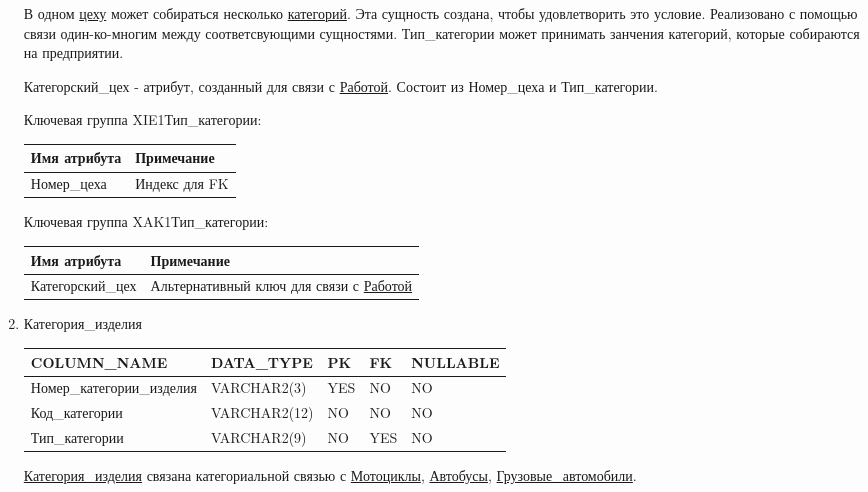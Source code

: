 \begin{enumerate}
    В одном \underline{цеху} может собираться несколько \underline{категорий}.
    Эта сущность создана, чтобы удовлетворить это условие. Реализовано с помощью связи один-ко-многим между соответсвующими сущностями.
    Тип\_категории может принимать занчения категорий, которые собираются на предприятии.

    Категорский\_цех - атрибут, созданный для связи с \underline{Работой}. Состоит из Номер\_цеха и Тип\_категории.

    Ключевая группа XIE1Тип\_категории:

    \begin{tabular}{|p{7cm}|p{9.3cm}|} \hline

        {\bf Имя атрибута} & {\bf Примечание} \\ \hline
        Номер\_цеха & Индекс для FK \\ \hline

    \end{tabular}

    Ключевая группа XAK1Тип\_категории:

    \begin{tabular}{|p{7cm}|p{9.3cm}|} \hline

        {\bf Имя атрибута} & {\bf Примечание} \\ \hline
        Категорский\_цех & Альтернативный ключ для связи с \underline{Работой} \\ \hline

    \end{tabular}

    \item{Категория\_изделия}

    \begin{tabular}{|p{7cm}|p{3cm}|p{1cm}|p{1cm}|p{3cm}|} \hline

        {\bf COLUMN\_NAME} & {\bf DATA\_TYPE} & {\bf PK} & {\bf FK} & {\bf NULLABLE} \\ \hline
        Номер\_категории\_изделия & VARCHAR2(3) & YES & NO & NO \\ \hline
        Код\_категории & VARCHAR2(12) & NO & NO & NO \\ \hline
        Тип\_категории & VARCHAR2(9) & NO & YES & NO \\ \hline

    \end{tabular}

    \underline{Категория\_изделия} связана категориальной связью с \underline{Мотоциклы}, \underline{Автобусы}, \underline{Грузовые\_автомобили}.


\end{enumerate}
